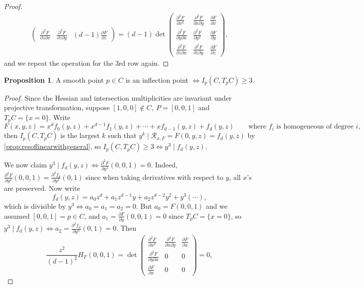 \documentclass{article}
\newcommand{\re}{\mathcal{R}}
\theoremstyle{definition}
\newtheorem{prop}[defn]{Proposition}
\begin{document}
\begin{proof}
\[\begin{aligned}
\begin{pmatrix}
\frac{\partial^2 F}{\partial z\partial x} & \frac{\partial^2 F}{\partial z\partial y} & (d-1)\frac{\partial F}{\partial z}
\end{pmatrix}=(d-1)\det \begin{pmatrix}
\frac{\partial^2 F}{\partial x^2} & \frac{\partial^2 F}{\partial x\partial y} & \frac{\partial F}{\partial x} \\
\frac{\partial^2 F}{\partial y\partial x} & \frac{\partial^2 F}{\partial y^2} & \frac{\partial F}{\partial y} \\
\frac{\partial^2 F}{\partial z\partial x} & \frac{\partial^2 F}{\partial z\partial y} & \frac{\partial F}{\partial z}
\end{pmatrix},
\end{aligned}
\]
and we repeat the operation for the 3rd row again.
\end{proof}

\begin{prop}
A smooth point $p\in C$ is an inflection point $\iff I_p(C,T_pC)\geq 3$.
\end{prop}
\begin{proof}
Since the Hessian and intersection multiplicities are invariant under projective transformation, suppose $[1,0,0]\notin C,\ P=[0,0,1]$ and $T_pC=\{x=0\}$. Write
\[
F(x,y,z)=x^df_0(y,z)+x^{d-1}f_1(y,z)+\cdots+xf_{d-1}(y,z)+f_d(y,z)\qquad\text{where }f_i\text{ is homogeneous of degree }i,
\]
then $I_p(C,T_pC)$ is the largest $k$ such that $y^k\mid\re_{x,F}=F(0,y,z)=f_d(y,z)$ by \ref{prop:resoflinearwithgeneral}, so $I_p(C,T_pC)\geq 3\iff y^3\mid f_d(y,z)$.

We now claim $y^3\mid f_d(y,z)\iff\frac{\partial^2 F}{\partial y^2}(0,0,1)=0$. Indeed, $\frac{\partial^2 F}{\partial y^2}(0,0,1)=\frac{\partial^2 f_d}{\partial y^2}(0,1)$ since when taking derivatives with respect to $y$, all $x$'s are preserved. Now write
\[
f_d(y,z)=a_0z^d+a_1z^{d-1}y+a_2z^{d-2}y^2+y^3(\cdots),
\]
which is divisible by $y^3\iff a_0=a_1=a_2=0$. But $a_0=F(0,0,1)$ and we assumed $[0,0,1]=p\in C$, and $a_1=\frac{\partial F}{\partial y}(0,0,1)=0$ since $T_pC=\{x=0\}$, so $y^3\mid f_d(y,z)\iff a_2=\frac{\partial^2 f_d}{\partial y^2}(0,1)=0$. Then
\[
\frac{z^2}{(d-1)^2}H_F(0,0,1)=\det\begin{pmatrix}
\frac{\partial^2 F}{\partial x^2} & \frac{\partial^2 F}{\partial x\partial y} & \frac{\partial F}{\partial x} \\
\frac{\partial^2 F}{\partial y\partial x} & 0 & 0 \\
\frac{\partial F}{\partial x} & 0 & 0
\end{pmatrix}=0,
\]
\end{proof}
\end{document}
